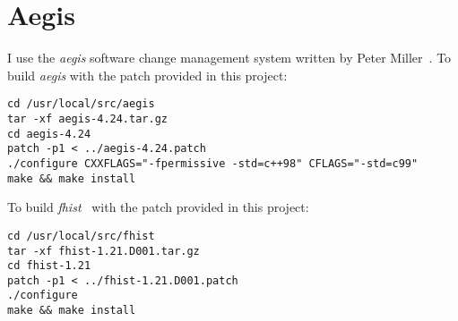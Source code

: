 \documentclass[a4paper,twoside,10pt,english]{report}
\begin{document}
\section*{Aegis}
I use the \emph{aegis} software change management system written by
Peter Miller~\cite{Miller_Wikipedia,Miller_aegis}. To build \emph{aegis} with
the patch provided in this project:
\begin{small}
\begin{verbatim} 
cd /usr/local/src/aegis
tar -xf aegis-4.24.tar.gz
cd aegis-4.24
patch -p1 < ../aegis-4.24.patch
./configure CXXFLAGS="-fpermissive -std=c++98" CFLAGS="-std=c99"
make && make install
\end{verbatim}
\end{small}
To build \emph{fhist}~\cite{Miller_fhist} with the patch provided in this 
project:
\begin{small}
\begin{verbatim} 
cd /usr/local/src/fhist
tar -xf fhist-1.21.D001.tar.gz
cd fhist-1.21
patch -p1 < ../fhist-1.21.D001.patch
./configure 
make && make install
\end{verbatim}
\end{small}

\cleardoublepage
{}
{}


\end{document}
